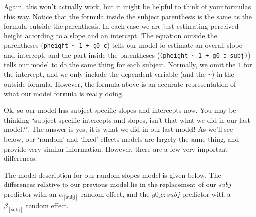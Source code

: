 \documentclass[
]{book}
\begin{document}
Again, this won't actually work, but it might be helpful to think of your formulas this way. Notice that the formula inside the subject parenthesis is the same as the formula outside the parenthesis. In each case we are just estimating perceived height according to a slope and an intercept. The equation outside the parentheses (\texttt{pheight\ \textasciitilde{}\ 1\ +\ g0\_c}) tells our model to estimate an overall slope and intercept, and the part inside the parentheses (\texttt{(pheight\ \textasciitilde{}\ 1\ +\ g0\_c\ \textbar{}subj)}) tells our model to do the same thing for each subject. Normally, we omit the \texttt{1} for the intercept, and we only include the dependent variable (and the \texttt{\textasciitilde{}}) in the outside formula. However, the formula above is an accurate representation of what our model formula is really doing.

Ok, so our model has subject specific slopes and intercepts now. You may be thinking ``subject specific intercepts and slopes, isn't that what we did in our last model?''. The answer is yes, it is what we did in our last model! As we'll see below, our `random' and `fixed' effects models are largely the same thing, and provide very similar information. However, there are a few very important differences.

The model description for our random slopes model is given below. The differences relative to our previous model lie in the replacement of our \(subj\) predictor with an \(\alpha_{[\mathrm{subj}]}\) random effect, and the \(g0 \_ c \colon subj\) predictor with a \(\beta_{[\mathrm{subj}]}\) random effect.
\end{document}
